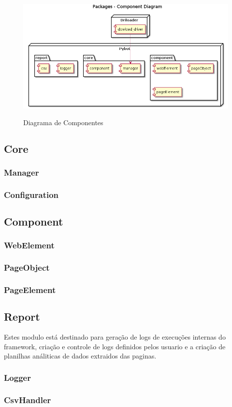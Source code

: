     \begin{figure}[H]
        \vspace*{0,3cm}
        \centering
        \caption{Diagrama de Componentes}
        \includegraphics[width=1\textwidth]{./04-figuras/model}
        \label{fig:modules}
    \end{figure}

    \subsection{Core}
        \subsubsection{Manager}
        \subsubsection{Configuration}

    \subsection{Component}


        \subsubsection{WebElement}
        \subsubsection{PageObject}
        \subsubsection{PageElement}

    \subsection{Report}

        Estes modulo está destinado para geração de logs de execuções internas do framework, criação e controle
        de logs definidos pelos usuario e a criação de planilhas análiticas de dados extraidos das paginas.

        \subsubsection{Logger}
        \subsubsection{CsvHandler}
